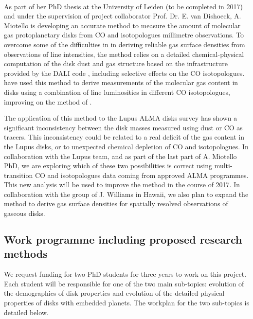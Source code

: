 \documentclass[10pt,fleqn,twoside]{article}
\begin{document}
\vspace{1em}{\Tcol\bf Disk gas masses from ALMA observations}\\
As part of her PhD thesis at the University of Leiden (to be completed in 2017) and under the supervision of project collaborator Prof. Dr. E. van Dishoeck, A. Miotello is developing an accurate method to measure the amount of molecular gas protoplanetary disks from CO and isotopologues millimetre observations. To overcome some of the difficulties in in deriving reliable gas surface densities from observations of line intensities, the method relies on a detailed chemical-physical computation of the disk dust and gas structure based on the infrastructure provided by the DALI code \citep{2012A&A...541A..91B}, including selective effects on the CO isotopologues. \citet{2016A&A...594A..85M} have used this method to derive measurements of the molecular gas content in disks using a combination of line luminosities in different CO isotopologues, improving on the method of \citet{2014ApJ...788...59W}.

The application of this method to the Lupus ALMA disks survey \citet[][see also Fig.~\ref{f_LADS}]{2016arXiv161201538M} has shown a significant inconsistency between the disk masses measured using dust or CO as tracers. This inconsistency could be related to a real deficit of the gas content in the Lupus disks, or to unexpected chemical depletion of CO and isotopologues. In collaboration with the Lupus team, and as part of the last part of A. Miotello PhD, we are exploring which of these two possibilities is correct using multi-transition CO and isotopologues data coming from approved ALMA programmes. This new analysis will be used to improve the method in the course of 2017. In collaboration with the group of J. Williams in Hawaii, we also plan to expand the method to derive gas surface densities for spatially resolved observations of gaseous disks.

\subsection{Work programme including proposed research methods}
\label{s_work}


%
%
We request funding for two PhD students for three years to work on this project. Each student will be responsible for one of the two main sub-topics:
evolution of the demographics of disk properties and evolution of the detailed physical properties of disks with embedded planets. The workplan for the two sub-topics is detailed below.
\end{document}
